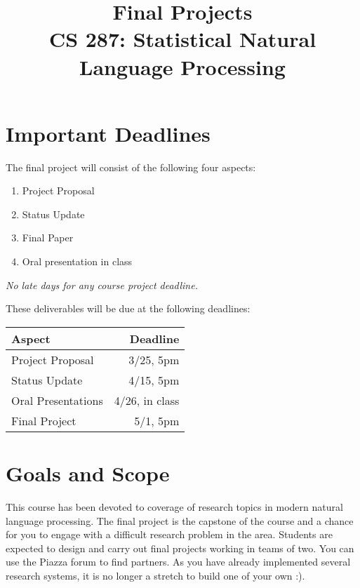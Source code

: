 \documentclass[11pt]{article}
\title{Final Projects  \\ CS 287: Statistical Natural Language Processing}
\date{}
\begin{document}
\maketitle{}

\section{Important Deadlines}

The final project will consist of the following four aspects:

\begin{enumerate}
\item Project Proposal
\item Status Update
\item Final Paper
\item Oral presentation in class
\end{enumerate}
\emph{No late days for any course project deadline.}

\vspace{0.25cm}

\noindent These deliverables will be due at the following deadlines:

\begin{center}
\begin{tabularx}{0.4\linewidth}{lr}
  \toprule
  Aspect & Deadline \\
  \midrule
  Project Proposal & 3/25, 5pm \\
  Status Update & 4/15, 5pm \\
  Oral Presentations&  4/26, in class \\
  Final Project &  5/1, 5pm \\
  \bottomrule
\end{tabularx}
\end{center}


\section{Goals and Scope}\label{goals-and-scope}

This course has been devoted to coverage of research
topics in modern natural language processing. The final 
project is the capstone of the course and a chance for you 
to engage with a difficult research problem in the area. 
Students are expected to design and carry out final
projects working in teams of two. You can use the Piazza forum
to find partners. 
As you have already implemented several research systems, 
it is no longer a stretch to build one of your own :).
\end{document}
